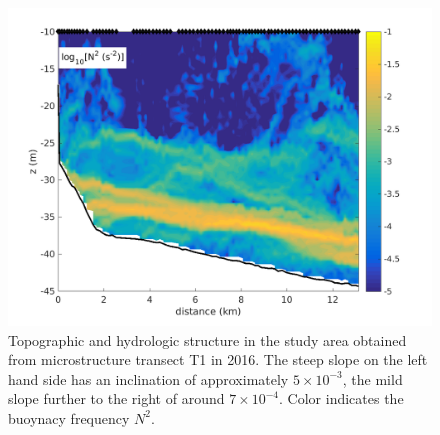 \begin{figure}[ht]
\includegraphics[width=40pc]{bilder/abslope.png}
 \caption{Topographic and hydrologic structure in the study area obtained from 
microstructure transect T1 in 2016. The steep slope on the left hand side has 
an inclination of approximately $5 \times 10^{-3}$, the mild slope further to 
the right of around $7 \times 10^{-4}$. Color indicates the buoynacy frequency 
$N^2$.}
 \label{abslope}
 \end{figure}


